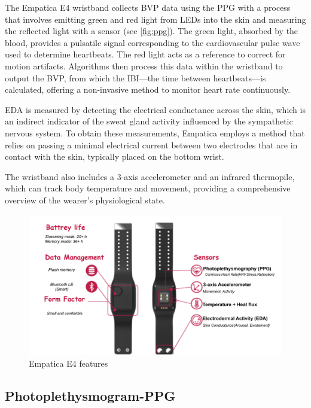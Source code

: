 The Empatica E4 wristband collects \gls{BVP} data using the \gls{PPG} with a process that involves emitting green and red light from LEDs into the skin and measuring the reflected light with a sensor (see \autoref{fig:ppg}). The green light, absorbed by the blood, provides a pulsatile signal corresponding to the cardiovascular pulse wave used to determine heartbeats. The red light acts as a reference to correct for motion artifacts. Algorithms then process this data within the wristband to output the \gls{BVP}, from which the \gls{IBI}—the time between heartbeats—is calculated, offering a non-invasive method to monitor heart rate continuously.\parencite{emp2}

\gls{EDA} is measured by detecting the electrical conductance across the skin, which is an indirect indicator of the sweat gland activity influenced by the sympathetic nervous system. To obtain these measurements, Empatica employs a method that relies on passing a minimal electrical current between two electrodes that are in contact with the skin, typically placed on the bottom wrist.

The wristband also includes a 3-axis accelerometer and an infrared thermopile, which can track body temperature and movement, providing a comprehensive overview of the wearer's physiological state.



\begin{figure}[!htbp]
	\centering
	\includegraphics[width=0.9\columnwidth]{images/e4.pdf}
	\caption{Empatica E4 features \parencite{emp}}
	\label{fig:empatica}
\end{figure}


\subsection*{Photoplethysmogram-PPG }
\label{subsec:PPGtheory}

